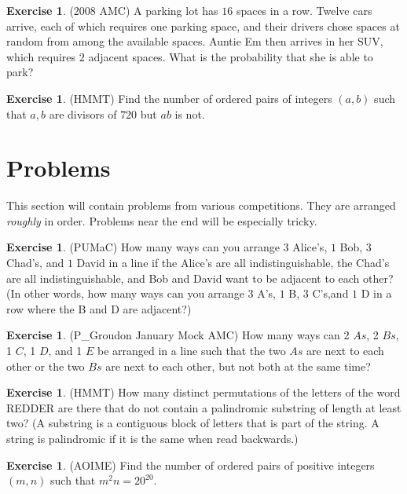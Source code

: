 \documentclass[letterpaper]{article}
\theoremstyle{remark}
\theoremstyle{definition}
\newtheorem{exercise}[thm]{Exercise}
\begin{document}
\begin{exercise}
(2008 AMC) A parking lot has $16$ spaces in a row. Twelve cars arrive, each of which requires one parking space, and their drivers chose spaces at random from among the available spaces. Auntie Em then arrives in her SUV, which requires $2$ adjacent spaces. What is the probability that she is able to park?
\end{exercise}

\begin{exercise}
(HMMT) Find the number of ordered pairs of integers $(a, b)$ such that $a, b$ are divisors of $720$ but $ab$ is not.
\end{exercise}

\section{Problems}
This section will contain problems from various competitions. They are arranged \textit{roughly} in order. Problems near the end will be especially tricky.

\begin{exercise}
(PUMaC) How many ways can you arrange $3$ Alice’s, $1$ Bob, $3$ Chad’s, and $1$ David in a line if the Alice’s are all indistinguishable, the Chad’s are all indistinguishable, and Bob and David want to be adjacent to each other? (In other words, how many ways can you arrange $3$ A’s, $1$ B, $3$ C’s,and $1$ D in a row where the B and D are adjacent?)
\end{exercise}

\begin{exercise}
(P\_Groudon January Mock AMC) How many ways can 2 $As$, 2 $Bs$, 1 $C$, 1 $D$, and 1 $E$ be arranged in a line such that the two $As$ are next to each other or the two $Bs$ are next to each other, but not both at the same time?
\end{exercise}

\begin{exercise}
(HMMT) How many distinct permutations of the letters of the word REDDER are there that do not contain a palindromic substring of length at least two? (A substring is a contiguous block of letters that is part of the string. A string is palindromic if it is the same when read backwards.)
\end{exercise}

\begin{exercise}
(AOIME) Find the number of ordered pairs of positive integers $(m,n)$ such that ${m^2n = 20 ^{20}}$.
\end{exercise}
\end{document}
